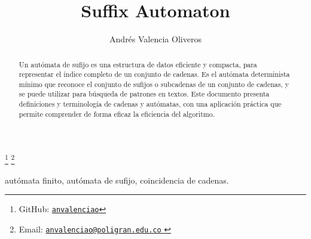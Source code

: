 \begin{frontmatter}
	\title{Suffix Automaton} 
	\author{Andrés Valencia Oliveros}
	\address{Facultad de Ingeniería, Diseño e Innovación\\ 
		Institución Universitaria Politécnico Grancolombiano\\
		Bogotá, Colombia
	}
	\thanks[myGitHub]{GitHub: 
		\href{https://github.com/anvalenciao/SuffixAutomaton}{\texttt{anvalenciao}}
	}
	\thanks[myEmail]{Email: 
		\href{mailto:anvalenciao@poligran.edu.co}{
			\texttt{\normalshape anvalenciao@poligran.edu.co}
		}
	}

	\renewcommand{\abstractname}{\textbf{Resumen}}
	\begin{abstract}
		Un autómata de sufijo es una estructura de datos eficiente y compacta, para representar el índice completo de un conjunto de cadenas. Es el autómata determinista mínimo que reconoce el conjunto de sufijos o subcadenas de un conjunto de cadenas, y se puede utilizar para búsqueda de patrones en textos. Este documento presenta definiciones y terminología de cadenas y autómatas, con una aplicación práctica que permite comprender de forma eficaz la eficiencia del algoritmo.
	\end{abstract}

	\begin{keyword}
		autómata finito, autómata de sufijo, coincidencia de cadenas.
	\end{keyword}
\end{frontmatter}